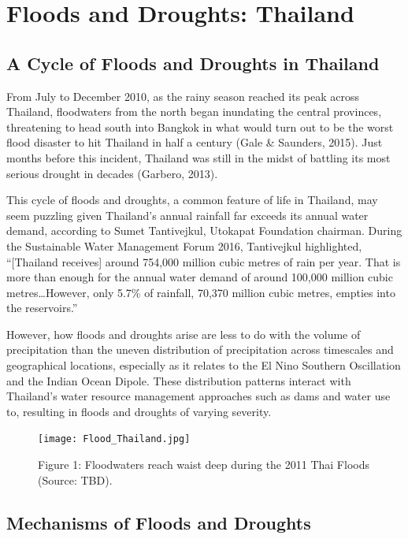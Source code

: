 \chapter{Floods and Droughts: Thailand}

\section{A Cycle of Floods and Droughts in Thailand}

From July to December 2010, as the rainy season reached its peak across Thailand, floodwaters from the north began inundating the central provinces, threatening to head south into Bangkok in what would turn out to be the worst flood disaster to hit Thailand in half a century (Gale \& Saunders, 2015). Just months before this incident, Thailand was still in the midst of battling its most serious drought in decades (Garbero, 2013). 

This cycle of floods and droughts, a common feature of life in Thailand, may seem puzzling given Thailand’s annual rainfall far exceeds its annual water demand, according to Sumet Tantivejkul, Utokapat Foundation chairman. During the Sustainable Water Management Forum 2016, Tantivejkul highlighted, ``[Thailand receives] around 754,000 million cubic metres of rain per year. That is more than enough for the annual water demand of around 100,000 million cubic metres\ldots However, only 5.7\% of rainfall, 70,370 million cubic metres, empties into the reservoirs.''

However, how floods and droughts arise are less to do with the volume of precipitation than the uneven distribution of precipitation across timescales and geographical locations, especially as it relates to the El Nino Southern Oscillation and the Indian Ocean Dipole. These distribution patterns interact with Thailand’s water resource management approaches such as dams and water use to, resulting in floods and droughts of varying severity.

\begin{figure}
	\centering
		\texttt{[image: Flood\_Thailand.jpg]}
	\caption{Figure 1: Floodwaters reach waist deep during the 2011 Thai Floods (Source: TBD).}
	\label{fig:Flood_Thailand}
\end{figure}


\section{Mechanisms of Floods and Droughts}

